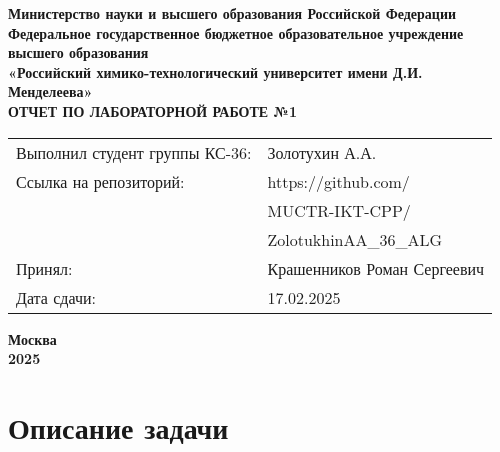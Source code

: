 \documentclass[12pt, a4paper]{report}
\begin{document}
	\begin{titlepage}
			\begin{center}
				\large \textbf{Министерство науки и высшего образования Российской Федерации} \\
				\large \textbf{Федеральное государственное бюджетное образовательное учреждение высшего образования} \\
				\large \textbf{«Российский химико-технологический университет имени Д.И. Менделеева»} \\

				\vspace*{4cm}
				\LARGE \textbf{ОТЧЕТ ПО ЛАБОРАТОРНОЙ РАБОТЕ №1}

				\vspace*{4cm}
				\begin{flushright}
					\Large
					\begin{tabular}{>{\raggedleft\arraybackslash}p{9cm} p{10cm}}
						Выполнил студент группы КС-36: & Золотухин А.А. \\
						Ссылка на репозиторий: & https://github.com/ \\ 
						& MUCTR-IKT-CPP/ \\
						& ZolotukhinAA\_36\_ALG \\
						Принял: & Крашенников Роман Сергеевич \\
						Дата сдачи: & 17.02.2025 \\
					\end{tabular}

				\end{flushright}

				\vspace*{6cm}
				\Large \textbf{Москва \\ 2025}
			\end{center}
		\end{titlepage}
		
		\tableofcontents	
		\thispagestyle{empty}
		\newpage

		
		\section*{Описание задачи}
\end{document}

